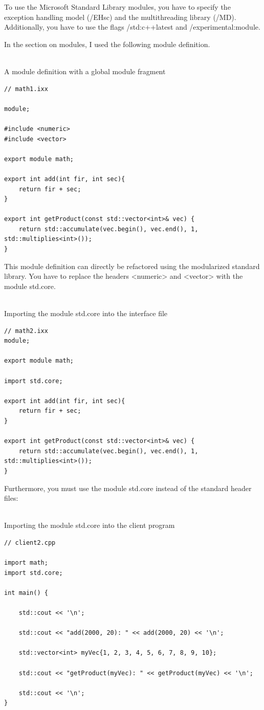To use the Microsoft Standard Library modules, you have to specify the exception handling model (/EHsc) and the multithreading library (/MD). Additionally, you have to use the flags /std:c++latest and /experimental:module.

In the section on modules, I used the following module definition.

\hspace*{\fill} \\ %
\noindent
A module definition with a global module fragment
\begin{lstlisting}[style=styleCXX]
// math1.ixx

module;

#include <numeric>
#include <vector>

export module math;

export int add(int fir, int sec){
	return fir + sec;
}

export int getProduct(const std::vector<int>& vec) {
	return std::accumulate(vec.begin(), vec.end(), 1, std::multiplies<int>());
}
\end{lstlisting}

This module definition can directly be refactored using the modularized standard library. You have to replace the headers <numeric> and <vector> with the module std.core.

\hspace*{\fill} \\ %
\noindent
Importing the module std.core into the interface file
\begin{lstlisting}[style=styleCXX]
// math2.ixx
module;

export module math;

import std.core;

export int add(int fir, int sec){
	return fir + sec;
}

export int getProduct(const std::vector<int>& vec) {
	return std::accumulate(vec.begin(), vec.end(), 1, std::multiplies<int>());
}
\end{lstlisting}

Furthermore, you must use the module std.core instead of the standard header files:

\hspace*{\fill} \\ %
\noindent
Importing the module std.core into the client program
\begin{lstlisting}[style=styleCXX]
// client2.cpp

import math;
import std.core;

int main() {
	
	std::cout << '\n';
	
	std::cout << "add(2000, 20): " << add(2000, 20) << '\n';
	
	std::vector<int> myVec{1, 2, 3, 4, 5, 6, 7, 8, 9, 10};
	
	std::cout << "getProduct(myVec): " << getProduct(myVec) << '\n';
	
	std::cout << '\n';
}
\end{lstlisting}


